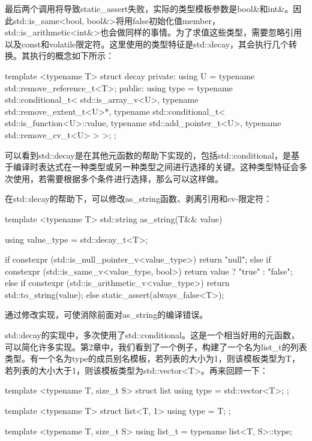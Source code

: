 最后两个调用将导致static_assert失败，实际的类型模板参数是bool\&和int\&。因此std::is_same<bool, bool\&>将用false初始化值member，std::is_arithmetic<int\&>也会做同样的事情。为了求值这些类型，需要忽略引用以及const和volatile限定符。这里使用的类型特征是std::decay，其会执行几个转换。其执行的概念如下所示：

\begin{cppcode}
template <typename T>
struct decay
{
private:
	using U = typename std::remove_reference_t<T>;
public:
	using type = typename std::conditional_t<
		std::is_array_v<U>,
		typename std::remove_extent_t<U>*,
		typename std::conditional_t<
			std::is_function<U>::value,
			typename std::add_pointer_t<U>,
			typename std::remove_cv_t<U>
		>
	>;
};
\end{cppcode}

可以看到std::decay是在其他元函数的帮助下实现的，包括std::conditional，是基于编译时表达式在一种类型或另一种类型之间进行选择的关键。这种类型特征会多次使用，若需要根据多个条件进行选择，那么可以这样做。

在std::decay的帮助下，可以修改as_string函数、剥离引用和cv-限定符：

\begin{cppcode}
template <typename T>
std::string as_string(T&& value)
{
	using value_type = std::decay_t<T>;

	if constexpr (std::is_null_pointer_v<value_type>)
		return "null";
	else if constexpr (std::is_same_v<value_type, bool>)
		return value ? "true" : "false";
	else if constexpr (std::is_arithmetic_v<value_type>)
		return std::to_string(value);
	else
		static_assert(always_false<T>);
}
\end{cppcode}

通过修改实现，可使消除前面对as_string的编译错误。

std::decay的实现中，多次使用了std::conditional。这是一个相当好用的元函数，可以简化许多实现。第2章中，我们看到了一个例子，构建了一个名为list_t的列表类型。有一个名为type的成员别名模板，若列表的大小为1，则该模板类型为T，若列表的大小大于1，则该模板类型为std::vector<T>。再来回顾一下：

\begin{cppcode}
template <typename T, size_t S>
struct list
{
	using type = std::vector<T>;
};

template <typename T>
struct list<T, 1>
{
	using type = T;
};

template <typename T, size_t S>
using list_t = typename list<T, S>::type;
\end{cppcode}

